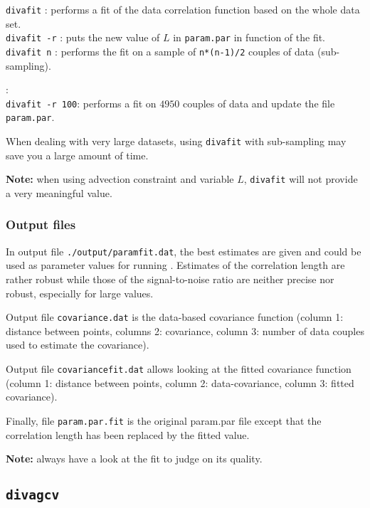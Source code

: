 \texttt{divafit} \qquad: performs a fit of the data correlation function based on the whole data set. \\
\texttt{divafit -r} \qquad: puts the new value of $L$ in \texttt{param.par} in function of the fit.\\
\texttt{divafit n} \qquad: performs the fit on a sample of \texttt{n*(n-1)/2} couples of data (sub-sampling). 

\examples:\\
\texttt{divafit -r 100}: performs a fit on $4950$ couples of data and update the file \texttt{param.par}.

\btips
When dealing with very large datasets, using \texttt{divafit} with sub-sampling may save you a large amount of time.
\etips

\textbf{Note:} when using advection constraint and variable $L$, \texttt{divafit} will not provide a very meaningful value.

\subsubsection{Output files}

In output file \texttt{./output/paramfit.dat}, the best estimates are given and could be used as parameter values for running \diva.
Estimates of the correlation length are rather robust while those of the signal-to-noise ratio are neither precise nor robust, especially for large values.

Output file \texttt{covariance.dat} is the data-based covariance function (column 1: distance between points, columns 2: covariance, column 3: number of data couples used to estimate the covariance). 

Output file \texttt{covariancefit.dat} allows looking at the fitted covariance function (column 1: distance between points, 
column 2: data-covariance, column 3: fitted covariance).

Finally, file \texttt{param.par.fit} is the original param.par file except that the correlation length has been replaced by the fitted value. 

\textbf{Note:} always have a look at the fit to judge on its quality. %

\subsection{\texttt{divagcv}}

